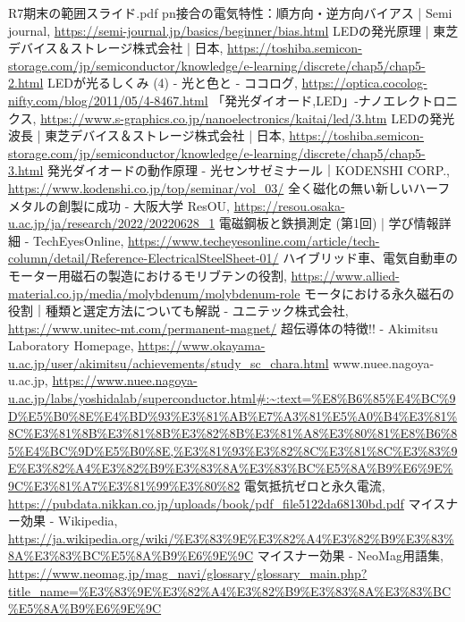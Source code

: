 \documentclass[11pt,a4paper]{ltjsarticle}
\begin{document}
\begin{thebibliography}{99}
     R7期末の範囲スライド.pdf
     pn接合の電気特性：順方向・逆方向バイアス | Semi journal, \url{https://semi-journal.jp/basics/beginner/bias.html}
     LEDの発光原理 | 東芝デバイス＆ストレージ株式会社 | 日本, \url{https://toshiba.semicon-storage.com/jp/semiconductor/knowledge/e-learning/discrete/chap5/chap5-2.html}
     LEDが光るしくみ (4) - 光と色と - ココログ, \url{https://optica.cocolog-nifty.com/blog/2011/05/4-8467.html}
     「発光ダイオード,LED」-ナノエレクトロニクス, \url{https://www.s-graphics.co.jp/nanoelectronics/kaitai/led/3.htm}
     LEDの発光波長 | 東芝デバイス＆ストレージ株式会社 | 日本, \url{https://toshiba.semicon-storage.com/jp/semiconductor/knowledge/e-learning/discrete/chap5/chap5-3.html}
     発光ダイオードの動作原理 - 光センサゼミナール｜KODENSHI CORP., \url{https://www.kodenshi.co.jp/top/seminar/vol_03/}
     全く磁化の無い新しいハーフメタルの創製に成功 - 大阪大学 ResOU, \url{https://resou.osaka-u.ac.jp/ja/research/2022/20220628_1}
     電磁鋼板と鉄損測定 (第1回) | 学び情報詳細 - TechEyesOnline, \url{https://www.techeyesonline.com/article/tech-column/detail/Reference-ElectricalSteelSheet-01/}
     ハイブリッド車、電気自動車のモーター用磁石の製造におけるモリブテンの役割, \url{https://www.allied-material.co.jp/media/molybdenum/molybdenum-role}
     モータにおける永久磁石の役割｜種類と選定方法についても解説 - ユニテック株式会社, \url{https://www.unitec-mt.com/permanent-magnet/}
     超伝導体の特徴!! - Akimitsu Laboratory Homepage, \url{https://www.okayama-u.ac.jp/user/akimitsu/achievements/study_sc_chara.html}
     www.nuee.nagoya-u.ac.jp, \url{https://www.nuee.nagoya-u.ac.jp/labs/yoshidalab/superconductor.html#:~:text=%E8%B6%85%E4%BC%9D%E5%B0%8E%E4%BD%93%E3%81%AB%E7%A3%81%E5%A0%B4%E3%81%8C%E3%81%8B%E3%81%8B%E3%82%8B%E3%81%A8%E3%80%81%E8%B6%85%E4%BC%9D%E5%B0%8E,%E3%81%93%E3%82%8C%E3%81%8C%E3%83%9E%E3%82%A4%E3%82%B9%E3%83%8A%E3%83%BC%E5%8A%B9%E6%9E%9C%E3%81%A7%E3%81%99%E3%80%82}
     電気抵抗ゼロと永久電流, \url{https://pubdata.nikkan.co.jp/uploads/book/pdf_file5122da68130bd.pdf}
     マイスナー効果 - Wikipedia, \url{https://ja.wikipedia.org/wiki/%E3%83%9E%E3%82%A4%E3%82%B9%E3%83%8A%E3%83%BC%E5%8A%B9%E6%9E%9C}
     マイスナー効果 - NeoMag用語集, \url{https://www.neomag.jp/mag_navi/glossary/glossary_main.php?title_name=%E3%83%9E%E3%82%A4%E3%82%B9%E3%83%8A%E3%83%BC%E5%8A%B9%E6%9E%9C}

\end{thebibliography}
\end{document}
